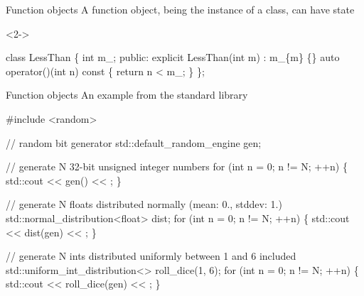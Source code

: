 \begin{frame}[fragile]{Function objects \insertcontinuationtext}
  A function object, being the instance of a class, can have state
  \begin{codeblock}<2->{
class LessThan \{
  \alert<2>{int m\_;}
 public:
  explicit \alert<2>{LessThan(int m) : m\_\{m\} \{\}}
  auto operator()(int n) const \{
    return n < m_;
  \}
\};



}\end{codeblock}


\end{frame}

\begin{frame}[fragile]{Function objects \insertcontinuationtext}
  An example from the standard library

  \begin{codeblock}
#include <random>

// random bit generator
std::default_random_engine gen;

// generate N 32-bit unsigned integer numbers
for (int n = 0; n != N; ++n) \{
  std::cout <{}< \alert{gen()} <{}< \bslashn;
\}

// generate N floats distributed normally (mean: 0., stddev: 1.)
std::normal\_distribution<float> dist;
for (int n = 0; n != N; ++n) \{
  std::cout <{}< \alert{dist(gen)} <{}< \bslashn;
\}

// generate N ints distributed uniformly between 1 and 6 included
std::uniform\_int\_distribution<> roll\_dice(1, 6);
for (int n = 0; n != N; ++n) \{
  std::cout <{}< \alert{roll\_dice(gen)} <{}< \bslashn;
\}\end{codeblock}

\end{frame}

